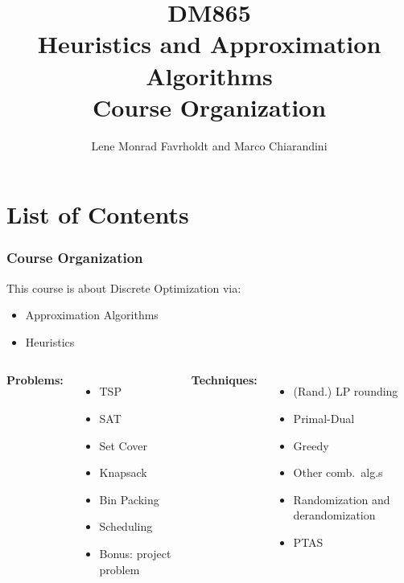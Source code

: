 \documentclass[handout,usepdftitle=false,aspectratio=169,smaller,compress,sans,fleqn,xcolor=dvipsnames,fleqn,table]{beamer}
\title{{\color{black}\normalfont\small DM865}\\
{\color{black}\normalfont\small Heuristics and Approximation Algorithms}\\[2em]
%
Course Organization}
\author{Lene Monrad Favrholdt and Marco Chiarandini}
\date{}
\begin{document}
\frame[plain]{%
\titlepage


}
%
%
%


\section{List of Contents}

\begin{frame}%
  \frametitle{Course Organization}

This course is about Discrete Optimization via:
\begin{itemize}

\item Approximation Algorithms
\item Heuristics 
\end{itemize}

\medskip

\pause
\begin{columns}[T,onlytextwidth]
\textbf{Problems:}

\begin{itemize}
  \itemsep=1ex
\item TSP
\item SAT
\item Set Cover
\item Knapsack
\item Bin Packing
\item Scheduling
\item Bonus: project problem
  \end{itemize}


\textbf{Techniques:} 

\begin{itemize}
  \itemsep=1ex
\item (Rand.) LP rounding
\item Primal-Dual
\smallskip
\item Greedy
\item Other comb.\ alg.s
\smallskip
\item Randomization and derandomization
\smallskip
\item PTAS
\end{itemize}


\end{columns}
\end{frame}
\end{document}
